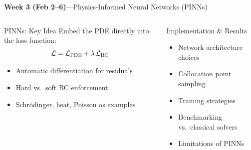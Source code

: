 \documentclass[aspectratio=169,11pt]{beamer}
\begin{document}
\begin{frame}{{\color{mlgold}\textbf{Week 3 (Feb 2--6)}\;---\;Physics-Informed Neural Networks (PINNs)}}
  \begin{columns}[T]
      \begin{block}{PINNs: Key Idea}
        Embed the PDE directly into the loss function:
        \[
          \mathcal{L} = \mathcal{L}_{\rm PDE} + \lambda\,\mathcal{L}_{\rm BC}
        \]
        \begin{itemize}\itemsep1pt
          \item Automatic differentiation for residuals
          \item Hard vs.\ soft BC enforcement
          \item Schr\"{o}dinger, heat, Poisson as examples
        \end{itemize}
      \end{block}
      \begin{block}{Implementation \& Results}
        \begin{itemize}\itemsep1pt
          \item Network architecture choices
          \item Collocation point sampling
          \item Training strategies
          \item Benchmarking vs.\ classical solvers
          \item Limitations of PINNs
        \end{itemize}
      \end{block}
  \end{columns}
\end{frame}
\end{document}
